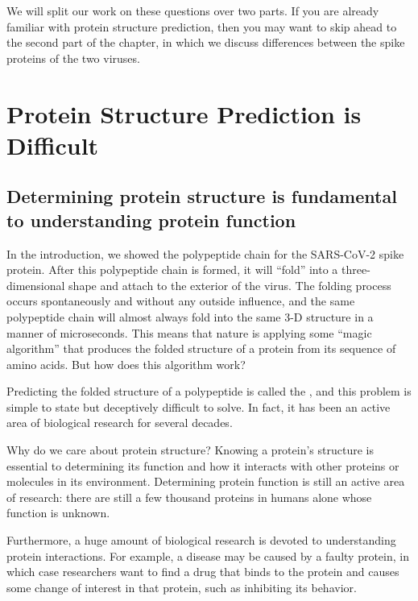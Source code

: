 We will split our work on these questions over two parts. If you are already familiar with protein structure prediction, then you may want to skip ahead to the second part of the chapter, in which we discuss differences between the spike proteins of the two viruses.\\

\FloatBarrier
{}

\section{Protein Structure Prediction is Difficult}
\label{sec:structure_intro}
\subsection{Determining protein structure is fundamental to understanding protein function}

In the introduction, we showed the polypeptide chain for the SARS-CoV-2 spike protein. After this polypeptide chain is formed, it will ``fold'' into a three-dimensional shape and attach to the exterior of the virus. The folding process occurs spontaneously and without any outside influence, and the same polypeptide chain will almost always fold into the same 3-D structure in a manner of microseconds. This means that nature is applying some ``magic algorithm'' that produces the folded structure of a protein from its sequence of amino acids. But how does this algorithm work?

Predicting the folded structure of a polypeptide is called the , and this problem is simple to state but deceptively difficult to solve. In fact, it has been an active area of biological research for several decades.

Why do we care about protein structure? Knowing a protein's structure is essential to determining its function and how it interacts with other proteins or molecules in its environment. Determining protein function is still an active area of research: there are still a few thousand proteins in humans alone whose function is unknown.

Furthermore,  a huge amount of biological research is devoted to understanding protein interactions. For example, a disease may be caused by a faulty protein, in which case researchers want to find a drug that binds to the protein and causes some change of interest in that protein, such as inhibiting its behavior.

